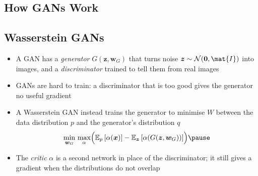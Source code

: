 \Outline %

\begin{slide}
\section{How GANs Work}

\pb\pause{}
\begin{center}
  \pause
\end{center}
\end{slide}


\begin{slide}
\section[-1]{Wasserstein GANs}

\begin{PauseHighLight}
  \begin{itemize}\squeeze
  \item A GAN has a \emph{generator} $G(\bm{z},\bm{w}_G)$ that turns
    noise $\bm{z}\sim\mathcal{N}(\bm{0},\mat{I})$ into images, and a
    \emph{discriminator} trained to tell them from real images\pause
  \item GANs are hard to train: a discriminator that is too good gives
    the generator no useful gradient\pause
  \item A Wasserstein GAN instead trains the generator to minimise $W$
    between the data distribution $p$ and the generator's distribution $q$
    \begin{align*}
      \min_{\bm{w}_G}\,\max_{\alpha}\Bigl(\av[p]{\alpha(\bm{x})} -
      \av[\bm{z}]{\alpha(G(\bm{z},\bm{w}_G))}\Bigr)\pause
    \end{align*}
  \item The \emph{critic} $\alpha$ is a second network in place of the
    discriminator; it still gives a gradient when the distributions do
    not overlap\pause
  \end{itemize}
\end{PauseHighLight}

\end{slide}


